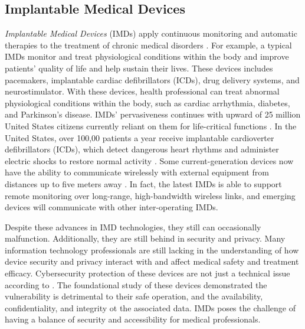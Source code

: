\documentclass{IEEEtran}
\begin{document}
\subsection{Implantable Medical Devices}
\emph{Implantable Medical Devices} (IMDs) apply continuous monitoring and automatic therapies to the treatment of chronic medical disorders \cite{Rostami:2013:HAI:2541806.2516658}. For example, a typical IMDs monitor and treat physiological conditions within the body and improve patients' quality of life and help sustain their lives.  These devices includes pacemakers, implantable cardiac defibrillators (ICDs), drug delivery systems, and neurostimulator. With these devices, health professional can treat abnormal physiological conditions within the body, such as cardiac arrhythmia, diabetes, and Parkinson's disease. IMDs' pervasiveness continues with upward of 25 million United States citizens currently reliant on them for life-critical functions \cite{halperin2008security}. In the United States, over 100,00 patients a year receive implantable cardioverter defibrillators (ICDs), which detect dangerous heart rhythms and administer electric shocks to restore normal activity \cite{Rostami:2013:HAI:2541806.2516658}. Some current-generation devices now have the ability to communicate wirelessly with external equipment from distances up to five meters away \cite{denning2010patients}. In fact, the latest IMDs is able to support remote monitoring over long-range, high-bandwidth wireless links, and emerging devices will communicate with other inter-operating IMDs. \par
Despite these advances in IMD technologies, they still can occasionally malfunction. Additionally, they are still behind in security and privacy. Many information technology professionals are still lacking in the understanding of how device security and privacy interact with and affect medical safety and treatment efficacy. Cybersecurity protection of these devices are not just a technical issue according to \cite{williams2015cybersecurity}. The foundational study of these devices demonstrated the vulnerability is detrimental to their safe operation, and the availability, confidentiality, and integrity ot the associated data. IMDs poses the challenge of having a balance of security and accessibility for medical professionals.	
\end{document}
